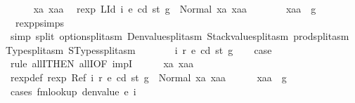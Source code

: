 \begin{isabellebody}
\ \ \ \ \isamarkupfalse%
\ xa\ xaa\ \isamarkupfalse%
\ {\isachardoublequoteopen}rexp\ {\isacharparenleft}{\kern0pt}L{\isachardot}{\kern0pt}Id\ i{\isacharparenright}{\kern0pt}\ e\ cd\ st\ g\ {\isacharequal}{\kern0pt}\ Normal\ {\isacharparenleft}{\kern0pt}xa{\isacharcomma}{\kern0pt}\ xaa{\isacharparenright}{\kern0pt}{\isachardoublequoteclose}\isanewline
\ \ \ \ \isamarkupfalse%
\ \isamarkupfalse%
\ {\isachardoublequoteopen}xaa\ {\isasymle}\ g{\isachardoublequoteclose}\ \isamarkupfalse%
\ {}{}{\isacharparenleft}{\kern0pt}{}{\isacharparenright}{\kern0pt}\ rexp{\isachardot}{\kern0pt}psimps{\isacharparenleft}{\kern0pt}{}{\isacharparenright}{\kern0pt}\ \isamarkupfalse%
\ {\isacharparenleft}{\kern0pt}simp\ split{\isacharcolon}{\kern0pt}\ option{\isachardot}{\kern0pt}split{\isacharunderscore}{\kern0pt}asm\ Denvalue{\isachardot}{\kern0pt}split{\isacharunderscore}{\kern0pt}asm\ Stackvalue{\isachardot}{\kern0pt}split{\isacharunderscore}{\kern0pt}asm\ prod{\isachardot}{\kern0pt}split{\isacharunderscore}{\kern0pt}asm\ Type{\isachardot}{\kern0pt}split{\isacharunderscore}{\kern0pt}asm\ STypes{\isachardot}{\kern0pt}split{\isacharunderscore}{\kern0pt}asm{\isacharparenright}{\kern0pt}\isanewline
\ \ \isamarkupfalse%
\isanewline
{}\isamarkupfalse%
\isanewline
\ \ \isamarkupfalse%
\ {\isacharparenleft}{\kern0pt}{}{}\ i\ r\ e\ cd\ st\ g{\isacharparenright}{\kern0pt}\isanewline
\ \ \isamarkupfalse%
\ {\isacharquery}{\kern0pt}case\isanewline
\ \ \isamarkupfalse%
\ {\isacharparenleft}{\kern0pt}rule\ allI{\isacharbrackleft}{\kern0pt}THEN\ allI{\isacharcomma}{\kern0pt}OF\ impI{\isacharbrackright}{\kern0pt}{\isacharparenright}{\kern0pt}\isanewline
\ \ \ \ \isamarkupfalse%
\ xa\ xaa\ \isamarkupfalse%
\ rexp{\isacharunderscore}{\kern0pt}def{\isacharcolon}{\kern0pt}\ {\isachardoublequoteopen}rexp\ {\isacharparenleft}{\kern0pt}Ref\ i\ r{\isacharparenright}{\kern0pt}\ e\ cd\ st\ g\ {\isacharequal}{\kern0pt}\ Normal\ {\isacharparenleft}{\kern0pt}xa{\isacharcomma}{\kern0pt}\ xaa{\isacharparenright}{\kern0pt}{\isachardoublequoteclose}\isanewline
\ \ \ \ \isamarkupfalse%
\ {\isachardoublequoteopen}xaa\ {\isasymle}\ g{\isachardoublequoteclose}\isanewline
\ \ \ \ \isamarkupfalse%
\ {\isacharparenleft}{\kern0pt}cases\ {\isachardoublequoteopen}fmlookup\ {\isacharparenleft}{\kern0pt}denvalue\ e{\isacharparenright}{\kern0pt}\ i{\isachardoublequoteclose}{\isacharparenright}{\kern0pt}\isanewline

\end{isabellebody}
